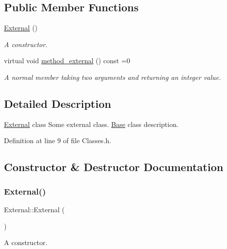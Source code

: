 \subsection*{Public Member Functions}
\begin{DoxyCompactItemize}
\item 
\hyperlink{class_external_ad2872b94971bb19971df29b1c04036fc}{External} ()
\begin{DoxyCompactList}\small\item\em A constructor. \end{DoxyCompactList}\item 
virtual void \hyperlink{class_external_a6bda85aa1f6f1396469261bd13d39e72}{method\+\_\+external} () const =0
\begin{DoxyCompactList}\small\item\em A normal member taking two arguments and returning an integer value. \end{DoxyCompactList}\end{DoxyCompactItemize}


\subsection{Detailed Description}
\hyperlink{class_external}{External} class Some external class. \hyperlink{class_base}{Base} class description. 

Definition at line 9 of file Classes.\+h.



\subsection{Constructor \& Destructor Documentation}
\mbox{\label{class_external_ad2872b94971bb19971df29b1c04036fc}} 
\subsubsection{\texorpdfstring{External()}{External()}}
{\footnotesize\ttfamily External\+::\+External (\begin{DoxyParamCaption}{ }\end{DoxyParamCaption})\hspace{0.3cm}{\ttfamily [inline]}}



A constructor. 

